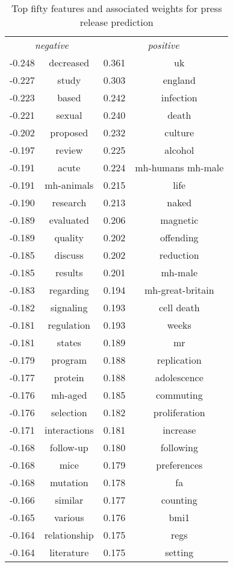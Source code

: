 \documentclass[paper=a4, fontsize=11pt]{scrartcl} %
\numberwithin{equation}{section} %
\numberwithin{figure}{section} %
\numberwithin{table}{section} %
\begin{document}
\begin{table}
\caption{Top fifty features and associated weights for press release prediction}
            \begin{tabular}{l c | l c}
\multicolumn{2}{c}{\emph{negative}} & \multicolumn{2}{c}{\emph{positive}} \\
-0.248 & decreased & 0.361 & uk \\
-0.227 & study & 0.303 & england \\
-0.223 & based & 0.242 & infection \\
-0.221 & sexual & 0.240 & death \\
-0.202 & proposed & 0.232 & culture \\
-0.197 & review & 0.225 & alcohol \\
-0.191 & acute & 0.224 & mh-humans mh-male \\
-0.191 & mh-animals & 0.215 & life \\
-0.190 & research & 0.213 & naked \\
-0.189 & evaluated & 0.206 & magnetic \\
-0.189 & quality & 0.202 & offending \\
-0.185 & discuss & 0.202 & reduction \\
-0.185 & results & 0.201 & mh-male \\
-0.183 & regarding & 0.194 & mh-great-britain \\
-0.182 & signaling & 0.193 & cell death \\
-0.181 & regulation & 0.193 & weeks \\
-0.181 & states & 0.189 & mr \\
-0.179 & program & 0.188 & replication \\
-0.177 & protein & 0.188 & adolescence \\
-0.176 & mh-aged & 0.185 & commuting \\
-0.176 & selection & 0.182 & proliferation \\
-0.171 & interactions & 0.181 & increase \\
-0.168 & follow-up & 0.180 & following \\
-0.168 & mice & 0.179 & preferences \\
-0.168 & mutation & 0.178 & fa \\
-0.166 & similar & 0.177 & counting \\
-0.165 & various & 0.176 & bmi1 \\
-0.164 & relationship & 0.175 & regs \\
-0.164 & literature & 0.175 & setting \\

\end{tabular}
\end{table}
\end{document}
